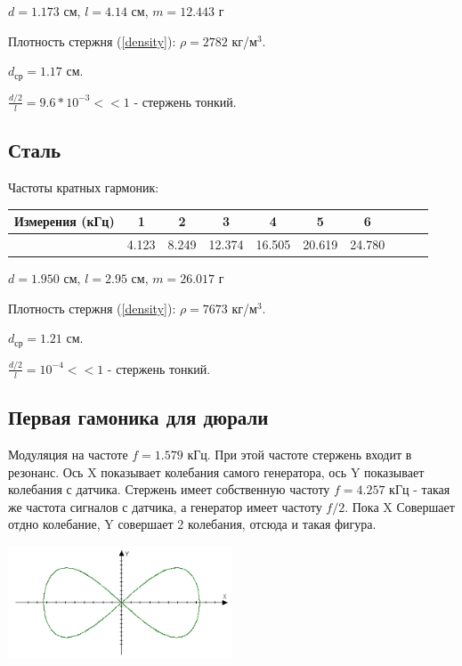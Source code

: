 \documentclass[a4paper,10pt]{article}
\begin{document}
	$d = 1.173 \text{ см}$, $l = 4.14 \text{ см}$, $m = 12.443 \text{ г}$
	
	Плотность стержня (\ref{density}): $\rho = 2782$ кг/м$^3$.
	
	$d_\text{ср} = 1.17$ см.
	
	$\frac{d / 2}{l} = 9.6 * 10^{-3} << 1$ - стержень тонкий.
	\subsection{Сталь}
	Частоты кратных гармоник: 
	\begin{center}
		\begin{tabular}{|c||c|c|c|c|c|c|c|c|c|}
			\hline
			Измерения (кГц) & 1 & 2 & 3 & 4 & 5 & 6 \\
			\hline
			& 4.123 & 8.249 & 12.374 & 16.505 & 20.619 & 24.780\\
			\hline
		\end{tabular}
	\end{center}
	
	$d = 1.950 \text{ см}$, $l = 2.95 \text{ см}$, $m = 26.017 \text{ г}$
	
	Плотность стержня (\ref{density}): $\rho = 7673$ кг/м$^3$.
	
	$d_\text{ср} = 1.21$ см.
	
	$\frac{d / 2}{l} = 10^{-4} << 1$ - стержень тонкий.
	
	\subsection{Первая гамоника для дюрали}
	Модуляция на частоте $f = 1.579$ кГц.
	При этой частоте стержень входит в резонанс. Ось X показывает колебания самого генератора, ось Y показывает колебания с датчика. Стержень имеет собственную частоту $f = 4.257$ кГц - такая же частота сигналов с датчика, а генератор имеет частоту $f / 2$. Пока X Совершает отдно колебание, Y совершает 2 колебания, отсюда и такая фигура.
	
	\begin{center}
		\includegraphics[width=0.5\textwidth]{лисссажу}
		\label{лисссажу}
	\end{center}
	
\end{document}
